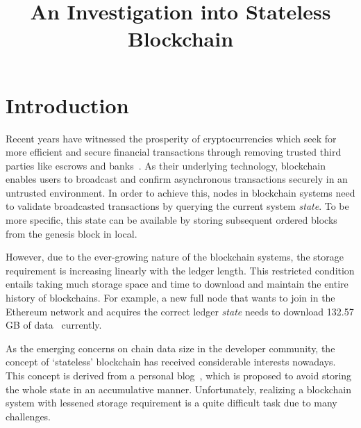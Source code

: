\documentclass[conference]{IEEEtran}
\begin{document}
\title{An Investigation into Stateless Blockchain}

\author{
\and

\and

}

\maketitle


\section{Introduction}
Recent years have witnessed the prosperity of cryptocurrencies which seek for more efficient and secure financial
transactions through removing trusted third parties like escrows and banks~\cite{SongWP00}.
%
As their underlying technology, blockchain enables users to broadcast and confirm asynchronous transactions securely in an untrusted environment.
%
In order to achieve this, nodes in blockchain systems need to validate broadcasted transactions by querying the current system \textit{state}.
%
To be more specific, this state can be available by storing subsequent ordered blocks from the genesis block in local.

However, due to the ever-growing nature of the blockchain systems, the storage requirement is increasing linearly with the ledger length.
%
This restricted condition entails taking much storage space and time to download and maintain the entire history of blockchains.
%
For example, a new full node that wants to join in the Ethereum network and acquires the correct ledger \textit{state} needs to download 132.57 GB of data~\cite{Ethereumstorage} currently. 

As the emerging concerns on chain data size in the developer community, the concept of `stateless' blockchain has received considerable interests nowadays.
%
This concept is derived from a personal blog~\cite{delayed-txo-commitments}, which is proposed to avoid storing the whole state in an accumulative manner.
%
Unfortunately, realizing a blockchain system with lessened storage requirement is a quite difficult task due to many challenges.
\end{document}
